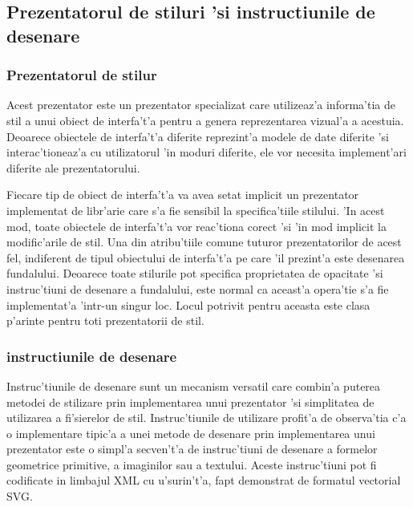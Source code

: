 \subsection{Prezentatorul de stiluri 'si instructiunile de desenare}

\subsubsection{Prezentatorul de stilur}

Acest prezentator este un prezentator specializat care utilizeaz'a informa'tia de stil a unui obiect de interfa't'a pentru a genera reprezentarea vizual'a a acestuia. Deoarece obiectele de interfa't'a diferite reprezint'a modele de date diferite 'si interac'tioneaz'a cu utilizatorul 'in moduri diferite, ele vor necesita implement'ari diferite ale prezentatorului.

\medskip

Fiecare tip de obiect de interfa't'a va avea setat implicit un prezentator implementat de libr'arie care s'a fie sensibil la specifica'tiile stilului. 'In acest mod, toate obiectele de interfa't'a vor reac'tiona corect 'si 'in mod implicit la modific'arile de stil. Una din atribu'tiile comune tuturor prezentatorilor de acest fel, indiferent de tipul obiectului de interfa't'a pe care 'il prezint'a este desenarea fundalului. Deoarece toate stilurile pot specifica proprietatea de opacitate 'si instruc'tiuni de desenare a fundalului, este normal ca aceast'a opera'tie s'a fie implementat'a 'intr-un singur loc. Locul potrivit pentru aceasta este clasa p'arinte pentru toti prezentatorii de stil.

\subsubsection{instructiunile de desenare}

Instruc'tiunile de desenare sunt un mecanism versatil care combin'a puterea metodei de stilizare prin implementarea unui prezentator 'si simplitatea de utilizarea a fi'sierelor de stil. Instruc'tiunile de utilizare profit'a de observa'tia c'a o implementare tipic'a a unei metode de desenare prin implementarea unui prezentator este o simpl'a secven't'a de instruc'tiuni de desenare a formelor geometrice primitive, a imaginilor sau a textului. Aceste instruc'tiuni pot fi codificate in limbajul XML cu u'surin't'a, fapt demonstrat de formatul vectorial SVG. 


